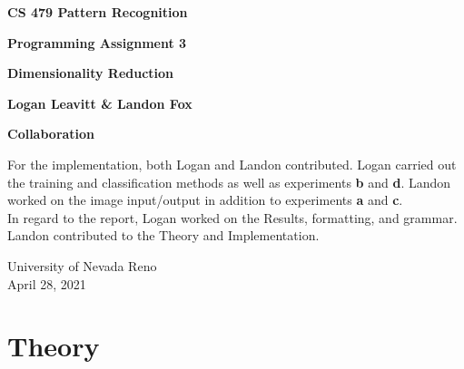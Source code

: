 \documentclass[ 12pt ]{article}
\begin{document}
\begin{titlepage}
    \begin{center}
        \vspace*{1cm}
            
        \LARGE
        \textbf{CS 479 Pattern Recognition}

        \vspace{0.5cm}
        \LARGE
        \textbf{Programming Assignment 3}

        \vspace{0.1cm}
        \LARGE
        \textbf{Dimensionality Reduction}
            
        \vspace{1.5cm}
            
        \textbf{Logan Leavitt \& Landon Fox}
            
        \vfill
        \Large
        \textbf{Collaboration}

        \vspace{0.1cm}
        \large
        For the implementation, both Logan and Landon contributed. Logan carried out the training and classification methods as well as experiments \textbf{b} and \textbf{d}.
        Landon worked on the image input/output in addition to experiments \textbf{a} and \textbf{c}. \\
        In regard to the report, Logan worked on the Results, formatting, and grammar. Landon contributed to the Theory and Implementation.
            
        \vspace{0.8cm}
            
            
        \Large
        University of Nevada Reno\\
        April 28, 2021
            
    \end{center}
\end{titlepage}


\section*{Theory}
\end{document}
